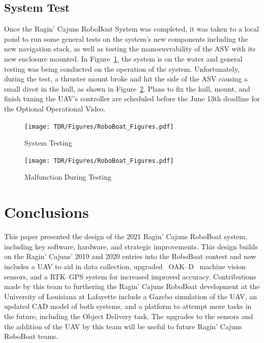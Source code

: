 \documentclass[letterpaper, 12 pt, conference]{ieeeconf}
\begin{document}
\subsection{System Test} 
% 
Once the Ragin' Cajuns RoboBoat System was completed, it was taken to a local pond to run some general tests on the system's new components including the new navigation stack, as well as testing the manoeuvrability of the ASV with its new enclosure mounted. In Figure~\ref{fig:systemTest}, the system is on the water and general testing was being conducted on the operation of the system. Unfortunately, during the test, a thruster mount broke and hit the side of the ASV causing a small divot in the hull, as shown in Figure~\ref{fig:brokenthrust}. Plans to fix the hull, mount, and finish tuning the UAV's controller are scheduled before the June 13th deadline for the Optional Operational Video. 
%
\begin{figure}[tb]
\vspace{0.05in}
\centering
\texttt{[image: TDR/Figures/RoboBoat\_Figures.pdf]}
\caption{System Testing}
\label{fig:systemTest}
\end{figure}
% 
%
\begin{figure}[tb]
\vspace{0.05in}
\centering
\texttt{[image: TDR/Figures/RoboBoat\_Figures.pdf]}
\caption{Malfunction During Testing}
\label{fig:brokenthrust}
\end{figure}
% 
%
\section{Conclusions}
% 
This paper presented the design of the 2021 Ragin' Cajuns RoboBoat system, including key software, hardware, and strategic improvements. This design builds on the Ragin' Cajuns' 2019 and 2020 entries into the RoboBoat contest and now includes a UAV to aid in data collection, upgraded ~OAK--D~ machine vision sensors, and a RTK--GPS system for increased improved accuracy. Contributions made by this team to furthering the Ragin' Cajuns RoboBoat development at the University of Louisiana at Lafayette include a Gazebo simulation of the UAV, an updated CAD model of both systems, and a platform to attempt more tasks in the future, including the Object Delivery task. The upgrades to the sensors and the addition of the UAV by this team will be useful to future Ragin' Cajuns RoboBoat teams.
% 
% 
\end{document}
